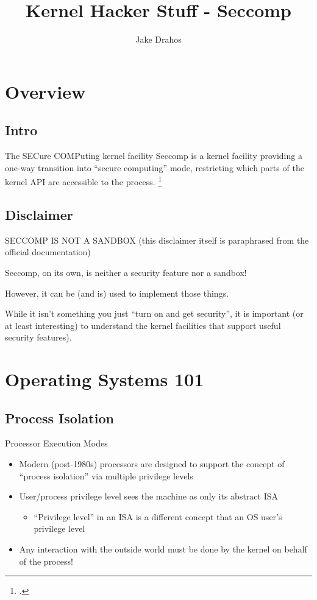 \documentclass[handout]{beamer}
\title{Kernel Hacker Stuff - Seccomp}
\author{Jake Drahos}
\begin{document}
\begin{frame}
 \titlepage
\end{frame}

\section{Overview}
\subsection{Intro}
\begin{frame}{The SECure COMPuting kernel facility}
    Seccomp is a kernel facility providing a one-way transition into ``secure computing'' mode,
    restricting which parts of the kernel API are accessible to the process. \footcite{kerneldoc}
\end{frame}

\subsection{Disclaimer}
\begin{frame}{SECCOMP IS NOT A SANDBOX}
  (this disclaimer itself is paraphrased from the official documentation)
  
  Seccomp, on its own, is neither a security feature nor a sandbox!
  
  \pause
  However, it can be (and is) used to implement those things.
  
  \pause
  While it isn't something you just ``turn on and get security'', it is important (or
  at least interesting) to understand the kernel facilities that support useful security features).
  
\end{frame}

\section{Operating Systems 101}
\subsection{Process Isolation}
\begin{frame}{Processor Execution Modes}
\begin{itemize}
 \item Modern (post-1980s) processors are designed to support the concept of ``process isolation''
 via multiple privilege levels
 \item User/process privilege level sees the machine as only its abstract ISA
    \begin{itemize}
        \item ``Privilege level'' in an ISA is a different concept that an OS user's privilege level
    \end{itemize}
 \item Any interaction with the outside world must be done by the kernel on behalf of the process!
\end{itemize}
\end{frame}
\end{document}
